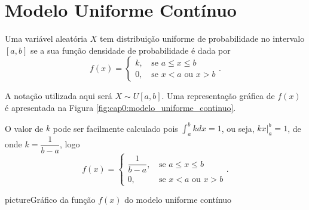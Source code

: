 \documentclass[11pt,fleqn]{book}
\numberwithin{mpicture}{chapter}
\numberwithin{mtable}{chapter}
\numberwithin{mframe}{chapter}
\begin{document}
\section{Modelo Uniforme Contínuo}

Uma variável aleatória $X$ tem distribuição uniforme de probabilidade no intervalo $[a,b]$ se a sua função densidade de probabilidade é dada por
\[
	f(x)=\begin{cases}
		k\text{,}&\text{ se } a\leqslant x \leqslant b\\
		0\text{,}&\text{ se } x < a\text{ ou }x>b
	\end{cases}
	\text{.}
\]

A notação utilizada aqui será $X \sim U[a,b]$. Uma representação gráfica de $f(x)$ é apresentada na Figura \ref{fig:cap0:modelo_uniforme_continuo}.

O valor de $k$ pode ser facilmente calculado pois $\displaystyle\int_a^b kdx = 1$, ou seja, $kx\Big|_a^b=1$, de onde $k=\dfrac{1}{b-a}$, logo
\[
	f(x)=\begin{cases}
		\dfrac{1}{b-a}\text{,}&\text{ se } a\leqslant x\leqslant b\\
		0\text{,}&\text{ se }x<a\text{ ou }x>b
	\end{cases}
	\text{.}
\]

\begin{sidepicture}{8cm}{picture}{Gráfico da função $f(x)$ do modelo uniforme contínuo}
	\label{fig:cap0:modelo_uniforme_continuo}
\end{sidepicture}
\end{document}
